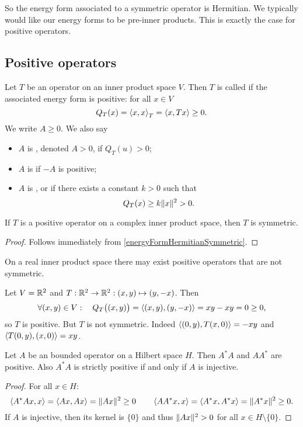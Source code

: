 So the energy form associated to a symmetric operator is Hermitian. We typically would like our energy forms to be pre-inner products. This is exactly the case for positive operators.

\subsection{Positive operators}
\begin{definition}
Let $T$ be an operator on an inner product space $V$. Then $T$ is called  if the associated energy form is positive: for all $x\in V$
\[ Q_T(x) = \left\langle x,x \right\rangle_T = \left\langle x,Tx \right\rangle \geq 0. \]
We write $A \geq 0$. We also say
\begin{itemize}
\item $A$ is , denoted $A > 0$, if $Q_T(u) > 0$;
\item $A$ is  if $-A$ is positive;
\item $A$ is ,  or  if there exists a constant $k>0$ such that
\[ Q_T(x) \geq k\lVert x\rVert^2 > 0. \]
\end{itemize}
\end{definition}

\begin{lemma} \label{positiveOperatorSymmetric}
If $T$ is a positive operator on a complex inner product space, then $T$ is symmetric.
\end{lemma}
\begin{proof}
Follows immediately from \ref{energyFormHermitianSymmetric}.
\end{proof}

On a real inner product space there may exist positive operators that are not symmetric.
\begin{example}
Let $V= \mathbb{R}^2$ and $T: \mathbb{R}^2 \to\mathbb{R}^2: (x,y)\mapsto (y,-x)$. Then
\[ \forall (x,y)\in V: \quad Q_T\big((x,y)\big) = \left\langle (x,y), (y,-x) \right\rangle = xy -xy = 0 \geq 0, \]
so $T$ is positive. But $T$ is not symmetric. Indeed $\left\langle (0,y), T(x,0) \right\rangle = -xy$ and $\left\langle T(0,y), (x, 0) \right\rangle = xy$.
\end{example}

\begin{lemma}
Let $A$ be an bounded operator on a Hilbert space $H$. Then $A^*A$ and $AA^*$ are positive. Also $A^*A$ is strictly positive \textup{if and only if} $A$ is injective.
\end{lemma}
\begin{proof}
For all $x\in H$:
\[ \left\langle A^*Ax,x \right\rangle = \left\langle Ax,Ax \right\rangle = \lVert Ax\rVert^2 \geq 0 \qquad \left\langle AA^*x,x \right\rangle = \left\langle A^*x,A^*x \right\rangle = \lVert A^*x\rVert^2 \geq 0. \]
If $A$ is injective, then its kernel is $\{0\}$ and thus $\lVert Ax\rVert^2 > 0$ for all $x\in H\setminus\{0\}$.
\end{proof}


